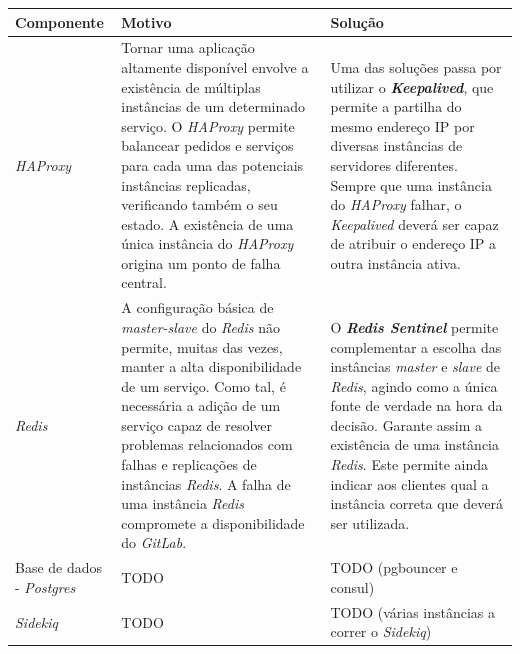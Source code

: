 \documentclass[12pt,a4paper]{article}
\begin{document}
\begin{table}[ht]
    \centering
    \begin{adjustbox}{width=1\textwidth}
    \small
    \begin{tabular}{ | p{5cm} | p{6cm} | p{6cm} |}
        \hline
        \textbf{Componente} & \textbf{Motivo} & \textbf{Solução} \\ \hline
       
        \textit{HAProxy} & Tornar uma aplicação altamente disponível envolve a existência de múltiplas instâncias de um determinado serviço. O \emph{HAProxy} permite balancear pedidos e serviços para cada uma das potenciais instâncias replicadas, verificando também o  seu estado. A existência de uma única instância do \emph{HAProxy} origina um ponto de falha central. & Uma das soluções passa por utilizar o \textbf{\textit{Keepalived}}, que permite a partilha do mesmo endereço IP por diversas instâncias de servidores diferentes. Sempre que uma instância do \emph{HAProxy} falhar, o \textit{Keepalived} deverá ser capaz de atribuir o endereço IP a outra instância ativa.  \\ \hline
        
        \emph{Redis} & A configuração básica de \emph{master-slave} do \emph{Redis} não permite, muitas das vezes, manter a alta disponibilidade de um serviço. Como tal, é necessária a adição de um serviço capaz de resolver problemas relacionados com falhas e replicações de instâncias \emph{Redis}. A falha de uma instância \emph{Redis} compromete a disponibilidade do \emph{GitLab}. & O \textbf{\emph{Redis Sentinel}} permite complementar a escolha das instâncias \emph{master} e \emph{slave} de  \emph{Redis}, agindo como a única fonte de verdade na hora da decisão. Garante assim a existência de uma instância \emph{Redis}.  Este permite ainda indicar aos clientes qual a instância correta que deverá ser utilizada.   \\ \hline
        
        Base de dados - \emph{Postgres} & TODO & TODO (pgbouncer e consul) \\ \hline
        
        \emph{Sidekiq} & TODO & TODO (várias instâncias a correr o \emph{Sidekiq}) \\ \hline
        

\end{tabular}
\end{adjustbox}
\end{table}
\end{document}
